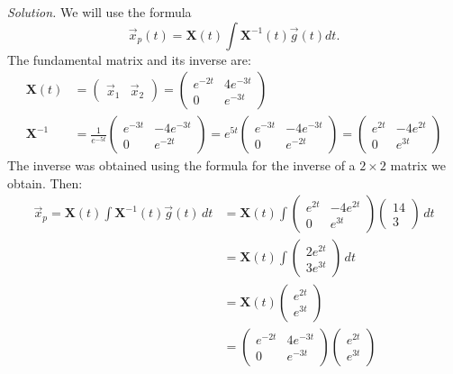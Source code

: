     \ifnum {} {\color{DarkBlue} \textit{Solution.} 
    We will use the formula
$$\vec x_p(t) = \mathbf{X}(t) \int \mathbf{X} ^ {-1} (t) \vec{g} (t) dt.$$
The fundamental matrix and its inverse are:
\begin{align}
    \mathbf{X} (t) &= \begin{pmatrix} \vec{x}_{1} & \vec{x}_{2}\end{pmatrix} 
    = \begin{pmatrix}  e ^ {-2t} & 4e ^ {-3t}\\ 0 &   e ^ {-3t} \end{pmatrix} \\
    \mathbf{X}^{-1} 
    &= \frac{1}{e^{-5t}}\begin{pmatrix} e^{-3t} & -4e^{-3t} \\0 & e^{-2t}\end{pmatrix} = e^{5t}\begin{pmatrix} e^{-3t} & -4e^{-3t} \\0 & e^{-2t}\end{pmatrix} 
    = \begin{pmatrix} e^{2t} & -4e^{2t} \\0 & e^{3t} \end{pmatrix}
\end{align}
The inverse was obtained using the formula for the inverse of a $2\times 2$ matrix we obtain. Then:
\begin{align}
    \vec x_p = \mathbf{X}(t) \int \mathbf{X} ^ {-1} (t) \vec{g}(t) \, dt 
    &= \mathbf{X}(t) \int \begin{pmatrix} e^{2t} & -4e^{2t} \\0 & e^{3t} \end{pmatrix} \begin{pmatrix} 14 \\ 3 \end{pmatrix} \, dt \\
    & = \mathbf{X}(t) \int \begin{pmatrix} 2e^{2t} \\ 3e^{3t}\end{pmatrix} \, dt \\
    & = \mathbf{X}(t)  \begin{pmatrix} e^{2t} \\ e^{3t}\end{pmatrix} \\
    & = \begin{pmatrix}  e ^ {-2t} & 4e ^ {-3t}\\ 0 &   e ^ {-3t} \end{pmatrix}  \begin{pmatrix} e^{2t} \\ e^{3t}\end{pmatrix} \\

\end{align}}
